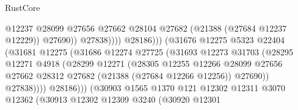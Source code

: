 \begin{lexlean}{RustCore}
\begin{coremodule}
                                                    @12237
                                                    @28099
                                                    @27656
                                                    @27662
                                                    @28104
                                                    @27682
                                                    (@21388 (@27684 @12237 @12229))
                                                    @27690))
                                                @27838))))
                                        @28186)))
                                  (@31676
                                    @12275
                                    @5323
                                    @22404
                                    (@31681
                                      @12275
                                      (@31686
                                        @12274
                                        @27725
                                        (@31693
                                          @12273
                                          @31703
                                          (@28295
                                            @12271
                                            @4918
                                            (@28299
                                              @12271
                                              (@28305
                                                @12255
                                                @12266
                                                @28099
                                                @27656
                                                @27662
                                                @28312
                                                @27682
                                                (@21388 (@27684 @12266 @12256))
                                                @27690))
                                            @27838))))
                                    @28186)))
                              (@30903
                                @1565
                                @1370
                                @121
                                @12302
                                @12311
                                @3070
                                @12362
                                (@30913
                                  @12302
                                  @12309
                                  @3240
                                  (@30920
                                    @12301

\end{coremodule}
\end{lexlean}
